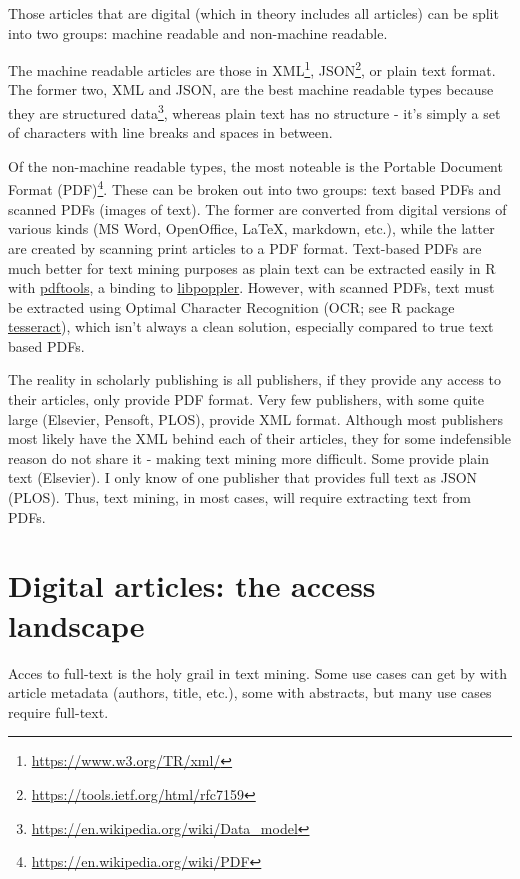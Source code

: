 \documentclass[author-year, review, 11pt]{components/elsarticle} %
\begin{document}
Those articles that are digital (which in theory includes all articles)
can be split into two groups: machine readable and non-machine readable.

The machine readable articles are those in XML\footnote{\url{https://www.w3.org/TR/xml/}},
JSON\footnote{\url{https://tools.ietf.org/html/rfc7159}}, or plain text
format. The former two, XML and JSON, are the best machine readable
types because they are structured data\footnote{\url{https://en.wikipedia.org/wiki/Data_model}},
whereas plain text has no structure - it's simply a set of characters
with line breaks and spaces in between.

Of the non-machine readable types, the most noteable is the Portable
Document Format (PDF)\footnote{\url{https://en.wikipedia.org/wiki/PDF}}.
These can be broken out into two groups: text based PDFs and scanned
PDFs (images of text). The former are converted from digital versions of
various kinds (MS Word, OpenOffice, LaTeX, markdown, etc.), while the
latter are created by scanning print articles to a PDF format.
Text-based PDFs are much better for text mining purposes as plain text
can be extracted easily in R with
\href{https://github.com/ropensci/pdftools}{pdftools}, a binding to
\href{https://poppler.freedesktop.org/}{libpoppler}. However, with
scanned PDFs, text must be extracted using Optimal Character Recognition
(OCR; see R package
\href{https://github.com/ropensci/tesseract}{tesseract}), which isn't
always a clean solution, especially compared to true text based PDFs.

The reality in scholarly publishing is all publishers, if they provide
any access to their articles, only provide PDF format. Very few
publishers, with some quite large (Elsevier, Pensoft, PLOS), provide XML
format. Although most publishers most likely have the XML behind each of
their articles, they for some indefensible reason do not share it -
making text mining more difficult. Some provide plain text (Elsevier). I
only know of one publisher that provides full text as JSON (PLOS). Thus,
text mining, in most cases, will require extracting text from PDFs.

\hypertarget{digital-articles-the-access-landscape}{%
\section{Digital articles: the access
landscape}\label{digital-articles-the-access-landscape}}

Acces to full-text is the holy grail in text mining. Some use cases can
get by with article metadata (authors, title, etc.), some with
abstracts, but many use cases require full-text.
\end{document}
